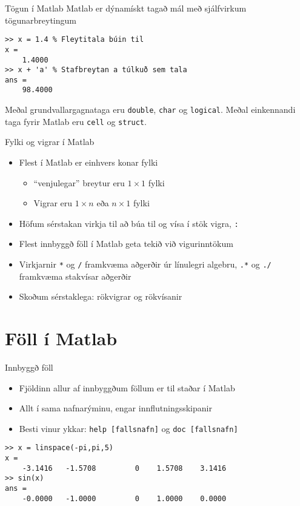 \documentclass{beamer}
\begin{document}
\begin{frame}[fragile]{Tögun í Matlab}
Matlab er dýnamískt tagað mál með sjálfvirkum tögunarbreytingum

\begin{verbatim}
>> x = 1.4 % Fleytitala búin til
x =
    1.4000
>> x + 'a' % Stafbreytan a túlkuð sem tala
ans =
    98.4000
\end{verbatim}

Meðal grundvallargagnataga eru \texttt{double}, \texttt{char} og \texttt{logical}. Meðal einkennandi taga fyrir Matlab eru \texttt{cell} og \texttt{struct}.

\end{frame}

\begin{frame}{Fylki og vigrar í Matlab}
    \begin{itemize}
        \item Flest í Matlab er einhvers konar fylki
        \begin{itemize}
            \item ``venjulegar'' breytur eru $1 \times 1$ fylki
            \item Vigrar eru $1 \times n$ eða $n \times 1$ fylki
        \end{itemize}
        \item Höfum sérstakan virkja til að búa til og vísa í stök vigra, \texttt{:}
        \item Flest innbyggð föll í Matlab geta tekið við vigurinntökum
        \item Virkjarnir \texttt{*} og \texttt{/} framkvæma aðgerðir úr línulegri algebru, \texttt{.*} og \texttt{./} framkvæma stakvísar aðgerðir
        \item Skoðum sérstaklega: rökvigrar og rökvísanir
    \end{itemize}
\end{frame}

\section{Föll í Matlab}

\begin{frame}[fragile]{Innbyggð föll}
    \begin{itemize}
        \item Fjöldinn allur af innbyggðum föllum er til staðar í Matlab
        \item Allt í sama nafnarýminu, engar innflutningsskipanir
        \item Besti vinur ykkar: \texttt{help [fallsnafn]} og \texttt{doc [fallsnafn]}
    \end{itemize}
    \begin{verbatim}
>> x = linspace(-pi,pi,5)
x =
    -3.1416   -1.5708         0    1.5708    3.1416
>> sin(x)
ans =
    -0.0000   -1.0000         0    1.0000    0.0000  
    \end{verbatim}
\end{frame}
\end{document}
